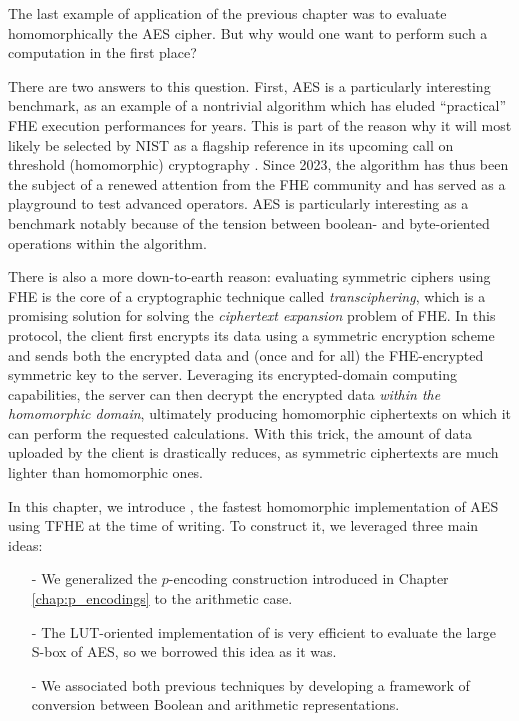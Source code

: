 The last example of application of the previous chapter was to evaluate homomorphically the \gls{AES} cipher.  But why would one want to perform such a computation in the first place?

There are two answers to this question. First,  \gls{AES} is a particularly interesting benchmark, as an example of a nontrivial algorithm which has eluded ``practical'' \gls{FHE} execution performances for years. This is part of the reason why it will most likely be selected by NIST as a flagship reference in its upcoming call on threshold (homomorphic) cryptography \cite{call_nist}. Since 2023, the algorithm has thus been the subject of a renewed attention from the \gls{FHE} community and has served as a playground to test advanced operators\cite{DBLP:conf/wahc/TramaCBS23, ISC:WWLLL23, TCHES:BonPoiRiv24, TCHES:WLWLLW24}. \gls{AES} is particularly interesting as a benchmark notably because of the tension between boolean- and byte-oriented operations within the algorithm.


There is also a more down-to-earth reason: evaluating symmetric ciphers using \gls{FHE} is the core of a cryptographic technique called \textit{transciphering}, which is a promising solution for solving the \textit{ciphertext expansion} problem of \gls{FHE}. In this protocol, the client first encrypts its data using a symmetric encryption scheme and sends both the encrypted data and (once and for all) the \gls{FHE}-encrypted symmetric key to the server. Leveraging its encrypted-domain computing capabilities, the server can then decrypt the encrypted data \emph{within the homomorphic domain}, ultimately producing homomorphic ciphertexts on which it can perform the requested calculations. With this trick, the amount of data uploaded by the client is drastically reduces, as symmetric ciphertexts are much lighter than homomorphic ones.


In this chapter, we introduce \hippo, the fastest homomorphic implementation of \gls{AES} using \gls{TFHE} at the time of writing. To construct it, we leveraged three main ideas:

\begin{itemize}
	\item[-] We generalized the $p$-encoding construction introduced in Chapter \ref{chap:p_encodings} to the arithmetic case.
	\item[-] The \gls{LUT}-oriented implementation of \cite{DBLP:conf/wahc/TramaCBS23} is very efficient to evaluate the large S-box of \gls{AES}, so we borrowed this idea as it was.
	\item[-] We associated both previous techniques by developing a framework of conversion between Boolean and arithmetic representations.
\end{itemize}


